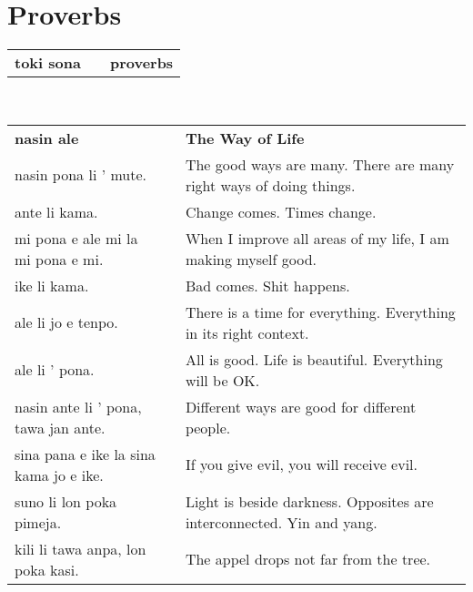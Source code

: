 %
\section{Proverbs}
%
\begin{supertabular}{p{6cm}|ll}
    \textbf{toki sona} &  & \textbf{proverbs} \\
\end{supertabular} \\
%
\begin{supertabular}{p{6cm}|ll}
    \textbf{nasin ale}                                 &  & \textbf{The Way of Life}                                              \\
    nasin pona li ' mute.                              &  & The good ways are many. There are many right ways of doing things.    \\
    ante li kama.                                      &  & Change comes. Times change.                                           \\
    mi pona e ale mi la mi pona e mi.                  &  & When I improve all areas of my life, I am making myself good.         \\
    ike li kama.                                       &  & Bad comes. Shit happens.                                              \\
    ale li jo e tenpo.                                 &  & There is a time for everything. Everything in its right context.      \\
    ale li ' pona.                                     &  & All is good. Life is beautiful. Everything will be OK.                \\
    nasin ante li ' pona, tawa jan ante.               &  & Different ways are good for different people.                         \\
    sina pana e ike la sina kama jo e ike.             &  & If you give evil, you will receive evil.                              \\
    suno li lon poka pimeja.                           &  & Light is beside darkness. Opposites are interconnected. Yin and yang. \\
    kili li tawa anpa, lon poka kasi.                  &  & The appel drops not far from the tree.                                \\

\end{supertabular}
